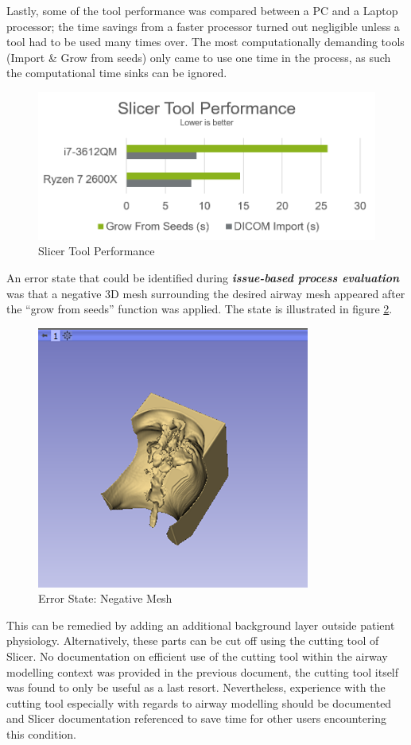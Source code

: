 \documentclass[MME,Projekt,english]{twbook}%
\begin{document}
Lastly, some of the tool performance was compared between a PC and a Laptop processor; the time savings from a faster processor turned out negligible unless a tool had to be used many times over. The most computationally demanding tools (Import \& Grow from seeds) only came to use one time in the process, as such the computational time sinks can be ignored.

\begin{figure}[!htbp]
	\centering
	\includegraphics[width=.8\linewidth]{images/slicer-tool-performance}
	\caption{Slicer Tool Performance}\label{slicer-tool-performance}
\end{figure}

An error state that could be identified during \textbf{\emph{issue-based process evaluation}} was that a negative 3D mesh surrounding the desired airway mesh appeared after the “grow from seeds” function was applied.  The state is illustrated in figure \ref{error-state-negative-mesh}.

\begin{figure}[!htbp]
	\centering
	\includegraphics[width=.5\linewidth]{images/error-state-negative-mesh}
	\caption{Error State: Negative Mesh}\label{error-state-negative-mesh}
\end{figure}

This can be remedied by adding an additional background layer outside patient physiology. Alternatively, these parts can be cut off using the cutting tool of Slicer. No documentation on efficient use of the cutting tool within the airway modelling context was provided in the previous document, the cutting tool itself was found to only be useful as a last resort. Nevertheless, experience with the cutting tool especially with regards to airway modelling should be documented and Slicer documentation referenced to save time for other users encountering this condition.
\end{document}
